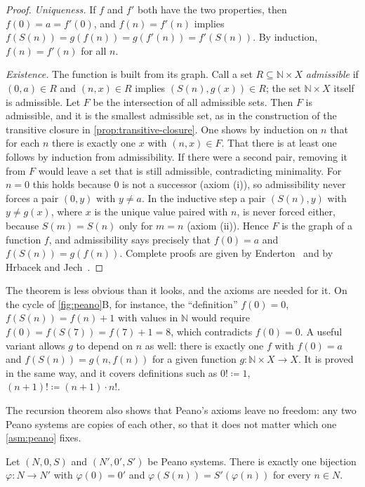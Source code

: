 \begin{proof}
\emph{Uniqueness.} If $f$ and $f'$ both have the two properties, then $f(0)=a=f'(0)$, and $f(n)=f'(n)$ implies $f(S(n))=g(f(n))=g(f'(n))=f'(S(n))$. By induction, $f(n)=f'(n)$ for all $n$.

\emph{Existence.} The function is built from its graph. Call a set $R\subseteq\mathbb N\times X$ \emph{admissible} if $(0,a)\in R$ and $(n,x)\in R$ implies $(S(n),g(x))\in R$; the set $\mathbb N\times X$ itself is admissible. Let $F$ be the intersection of all admissible sets. Then $F$ is admissible, and it is the smallest admissible set, as in the construction of the transitive closure in \cref{prop:transitive-closure}. One shows by induction on $n$ that for each $n$ there is exactly one $x$ with $(n,x)\in F$. That there is at least one follows by induction from admissibility. If there were a second pair, removing it from $F$ would leave a set that is still admissible, contradicting minimality. For $n=0$ this holds because $0$ is not a successor (axiom (i)), so admissibility never forces a pair $(0,y)$ with $y\ne a$. In the inductive step a pair $(S(n),y)$ with $y\ne g(x)$, where $x$ is the unique value paired with $n$, is never forced either, because $S(m)=S(n)$ only for $m=n$ (axiom (ii)). Hence $F$ is the graph of a function $f$, and admissibility says precisely that $f(0)=a$ and $f(S(n))=g(f(n))$. Complete proofs are given by Enderton~\cite{enderton1977sets} and by Hrbacek and Jech~\cite{hrbacek1999}.
\end{proof}

The theorem is less obvious than it looks, and the axioms are needed for it. On the cycle of \cref{fig:peano}B, for instance, the ``definition'' $f(0)=0$, $f(S(n))=f(n)+1$ with values in $\mathbb N$ would require $f(0)=f(S(7))=f(7)+1=8$, which contradicts $f(0)=0$. A useful variant allows $g$ to depend on $n$ as well: there is exactly one $f$ with $f(0)=a$ and $f(S(n))=g(n,f(n))$ for a given function $g\colon\mathbb N\times X\to X$. It is proved in the same way, and it covers definitions such as $0!\coloneqq1$, $(n+1)!\coloneqq(n+1)\cdot n!$.

The recursion theorem also shows that Peano's axioms leave no freedom: any two Peano systems are copies of each other, so that it does not matter which one \cref{asm:peano} fixes.

\begin{proposition}[Dedekind]
\label{prop:peano-unique}
Let $(N,0,S)$ and $(N',0',S')$ be Peano systems. There is exactly one bijection $\varphi\colon N\to N'$ with $\varphi(0)=0'$ and $\varphi(S(n))=S'(\varphi(n))$ for every $n\in N$.
\end{proposition}

